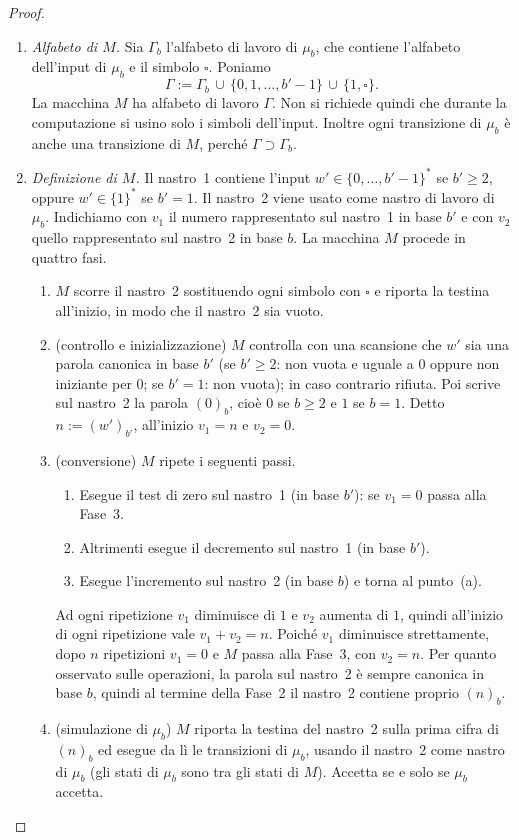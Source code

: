 \begin{prop}
\begin{proof}
\begin{enumerate}
    \item[2.] \emph{Alfabeto di $M$.} Sia $\Gamma_b$ l'alfabeto di lavoro di $\mu_b$, che contiene l'alfabeto dell'input di $\mu_b$ e il simbolo $\square$. Poniamo
    \[
    \Gamma:=\Gamma_b\,\cup\,\{0,1,\dots,b'-1\}\,\cup\,\{1,\square\}.
    \]
    La macchina $M$ ha alfabeto di lavoro $\Gamma$. Non si richiede quindi che durante la computazione si usino solo i simboli dell'input. Inoltre ogni transizione di $\mu_b$ è anche una transizione di $M$, perché $\Gamma\supset\Gamma_b$.

    \item[3.] \emph{Definizione di $M$.} Il nastro~1 contiene l'input $w'\in\{0,\dots,b'-1\}^*$ se $b'\geq 2$, oppure $w'\in\{1\}^*$ se $b'=1$. Il nastro~2 viene usato come nastro di lavoro di $\mu_b$. Indichiamo con $v_1$ il numero rappresentato sul nastro~1 in base $b'$ e con $v_2$ quello rappresentato sul nastro~2 in base $b$. La macchina $M$ procede in quattro fasi.
    \begin{enumerate}
        \item[Fase 0.] $M$ scorre il nastro~2 sostituendo ogni simbolo con $\square$ e riporta la testina all'inizio, in modo che il nastro~2 sia vuoto.
        \item[Fase 1.] (controllo e inizializzazione) $M$ controlla con una scansione che $w'$ sia una parola canonica in base $b'$ (se $b'\geq 2$: non vuota e uguale a $0$ oppure non iniziante per $0$; se $b'=1$: non vuota); in caso contrario rifiuta. Poi scrive sul nastro~2 la parola $(0)_b$, cioè $0$ se $b\geq 2$ e $1$ se $b=1$. Detto $n:=(w')_{b'}$, all'inizio $v_1=n$ e $v_2=0$.
        \item[Fase 2.] (conversione) $M$ ripete i seguenti passi.
        \begin{enumerate}
            \item Esegue il test di zero sul nastro~1 (in base $b'$): se $v_1=0$ passa alla Fase~3.
            \item Altrimenti esegue il decremento sul nastro~1 (in base $b'$).
            \item Esegue l'incremento sul nastro~2 (in base $b$) e torna al punto~(a).
        \end{enumerate}
        Ad ogni ripetizione $v_1$ diminuisce di $1$ e $v_2$ aumenta di $1$, quindi all'inizio di ogni ripetizione vale $v_1+v_2=n$. Poiché $v_1$ diminuisce strettamente, dopo $n$ ripetizioni $v_1=0$ e $M$ passa alla Fase~3, con $v_2=n$. Per quanto osservato sulle operazioni, la parola sul nastro~2 è sempre canonica in base $b$, quindi al termine della Fase~2 il nastro~2 contiene proprio $(n)_b$.
        \item[Fase 3.] (simulazione di $\mu_b$) $M$ riporta la testina del nastro~2 sulla prima cifra di $(n)_b$ ed esegue da lì le transizioni di $\mu_b$, usando il nastro~2 come nastro di $\mu_b$ (gli stati di $\mu_b$ sono tra gli stati di $M$). Accetta se e solo se $\mu_b$ accetta.
    \end{enumerate}


\end{enumerate}
\end{proof}
\end{prop}
